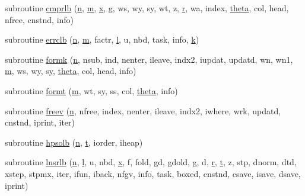 \begin{DoxyCompactItemize}
\item 
subroutine \hyperlink{lbfgsb_8f_aeca70b38353e4c44297fef717a66def4}{cmprlb} (\hyperlink{indexexpr_8h_ab427e2e2b4d6cec55fa088ea2a692ace}{n}, \hyperlink{indexexpr_8h_ab72fdb4031d47b75ab26dd18a437bcdc}{m}, \hyperlink{vecnorm1_8cc_ac73eed9e41ec09d58f112f06c2d6cb63}{x}, g, ws, wy, sy, wt, z, \hyperlink{indexexpr_8h_ac434fd11cc2493608d8d91424d60c17e}{r}, wa, index, \hyperlink{gen__mat5files_8m_a485aacac5dba13c16bc07a75e7af465c}{theta}, col, head, nfree, cnstnd, info)
\item 
subroutine \hyperlink{lbfgsb_8f_affdf5cf80f86556653ba2cc860a2bb32}{errclb} (\hyperlink{indexexpr_8h_ab427e2e2b4d6cec55fa088ea2a692ace}{n}, \hyperlink{indexexpr_8h_ab72fdb4031d47b75ab26dd18a437bcdc}{m}, factr, \hyperlink{indexexpr_8h_a88aacdaa46b76729743ee33ef8b95a58}{l}, u, nbd, task, info, \hyperlink{indexexpr_8h_abb72938a198351550846b37a84588b63}{k})
\item 
subroutine \hyperlink{lbfgsb_8f_a0e64ef7f777edb20419c8d441107c654}{formk} (\hyperlink{indexexpr_8h_ab427e2e2b4d6cec55fa088ea2a692ace}{n}, nsub, ind, nenter, ileave, indx2, iupdat, updatd, wn, wn1, \hyperlink{indexexpr_8h_ab72fdb4031d47b75ab26dd18a437bcdc}{m}, ws, wy, sy, \hyperlink{gen__mat5files_8m_a485aacac5dba13c16bc07a75e7af465c}{theta}, col, head, info)
\item 
subroutine \hyperlink{lbfgsb_8f_a237bf34b63889556b05399c224ec5f71}{formt} (\hyperlink{indexexpr_8h_ab72fdb4031d47b75ab26dd18a437bcdc}{m}, wt, sy, ss, col, \hyperlink{gen__mat5files_8m_a485aacac5dba13c16bc07a75e7af465c}{theta}, info)
\item 
subroutine \hyperlink{lbfgsb_8f_a9e31e2bbd26db0eabd2e72c99e5a2f84}{freev} (\hyperlink{indexexpr_8h_ab427e2e2b4d6cec55fa088ea2a692ace}{n}, nfree, index, nenter, ileave, indx2, iwhere, wrk, updatd, cnstnd, iprint, iter)
\item 
subroutine \hyperlink{lbfgsb_8f_a94349c617519970019d2f15efcb1df41}{hpsolb} (\hyperlink{indexexpr_8h_ab427e2e2b4d6cec55fa088ea2a692ace}{n}, \hyperlink{indexexpr_8h_a01709998b82be3f34e0412206618d09d}{t}, iorder, iheap)
\item 
subroutine \hyperlink{lbfgsb_8f_a39a5ed1544c79127ec31703136240b70}{lnsrlb} (\hyperlink{indexexpr_8h_ab427e2e2b4d6cec55fa088ea2a692ace}{n}, \hyperlink{indexexpr_8h_a88aacdaa46b76729743ee33ef8b95a58}{l}, u, nbd, \hyperlink{vecnorm1_8cc_ac73eed9e41ec09d58f112f06c2d6cb63}{x}, f, fold, gd, gdold, g, d, \hyperlink{indexexpr_8h_ac434fd11cc2493608d8d91424d60c17e}{r}, \hyperlink{indexexpr_8h_a01709998b82be3f34e0412206618d09d}{t}, z, stp, dnorm, dtd, xstep, stpmx, iter, ifun, iback, nfgv, info, task, boxed, cnstnd, csave, isave, dsave, iprint)

\end{DoxyCompactItemize}
